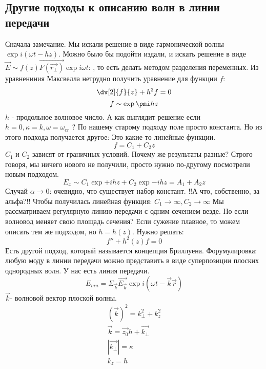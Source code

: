\subsection{Другие подходы к описанию волн в линии передачи}
Сначала замечание.
%
Мы искали решение в виде гармонической волны $\exp{i(\omega t - h z)}$. Можно было бы подойти издали, и искать решение в виде $\vec{E} \sim f(z) \vec{F(\vec{r_\perp})} \exp{i \omega t}$: , то есть делать методом разделения переменных.
%
Из уравнениния Максвелла нетрудно получить уравнение для функции $f$:
\begin{equation}
	\dv[2]{f}{z} + h^2 f = 0
\end{equation}
\begin{equation}
	f \sim \exp{\pmi h z}
\end{equation}
$h$ - продольное волновое число.
%
А как выглядит решение если $h = 0, \kappa = k, \omega = \omega_{cr}$ ?
%
По нашему старому подходу поле просто константа.
Но из этого подхода получается другое:
Это какие-то линейные функции.
\begin{equation}
	f = C_1 + C_2 z
\end{equation}
$C_1$ и $C_2$ зависят от граничных условий.
%
Почему же результаты разные? Строго говоря, мы ничего нового не получили, просто нужно по-другому посмотрели новым подходом.
\begin{equation}
	E_{x} \sim{C_1 \exp{+i h z} + C_2 \exp{-i h z}} = A_1 +A_2 z
\end{equation}
Случай $\alpha \rightarrow 0$: очевидно, что существует набор констант. !!А что, собственно, за альфа?!!
Чтобы получилась линейная функция: $C_1 \rightarrow \infty, C_2 \rightarrow \infty$
%
Мы рассматриваем регулярную линию передачи с одним сечением везде. Но если волновод меняет свою площадь сечения?
%
Если сужение плавное, то можем описать тем же подходом, но $h = h(z)$. Нужно решать:
\begin{equation}
	f'' + h^2(z) f = 0
\end{equation}
Есть другой подход, который называется концепция Бриллуена. 
%
Форумулировка: любую моду в линии передачи можно представить в виде суперпозиции плоских однородных волн. 
%
У нас есть линия передачи.
\begin{equation}
	E_{mn} = \Sigma_{\vec{k}} \vec{E_{\vec{k}}} \exp{i(\omega t -\vec{k} \vec{r} )}
\end{equation}
$\vec{k}$- волновой вектор плоской волны. 
\begin{gather}
	(\vec{k})^2 = k_{\perp}^2 + k_z^2\\
	\vec{k} = \vec{z_0} h + \vec{k_{\perp}}\\
	|\vec{k_{\perp}}| = \kappa\\
	k_{z} = h
\end{gather}
